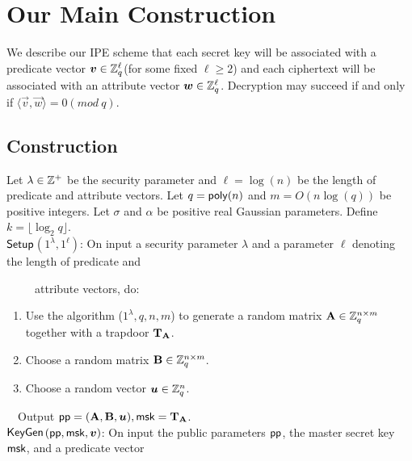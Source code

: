 \section{Our Main Construction}
We describe our IPE scheme that each secret key will be associated with a predicate vector $\boldsymbol{v} \in \mathbb{Z}^{\ell}_{q}$(for some fixed $\ell\geq 2$) and each ciphertext will be associated with an attribute vector $\boldsymbol{w} \in \mathbb{Z}^{\ell}_{q}$. Decryption may succeed if and only if $\langle \vec{v},\vec{w} \rangle=0 (mod\ q)$.
\subsection{Construction}
Let $\lambda \in \mathbb{Z}^{+}$ be the security parameter and $\ell=\log(n)$ be the length of predicate and attribute vectors. Let $q=\mathsf{poly}(n)$ and $m=O(n\log(q))$ be positive integers. Let $\sigma$ and $\alpha$ be positive real Gaussian parameters. Define $k=\lfloor \log_{2}q\rfloor$. \\[0.6cm]
$\mathsf{Setup}$$(1^{\lambda},1^{\ell})$: On input a security parameter $\lambda$ and a parameter $\ell$ denoting the length of predicate and

~~~~~attribute vectors, do:
\begin{enumerate}
\item Use the algorithm \trapgen ($1^{\lambda},q,n,m$) to generate a random matrix $\textbf{A} \in \mathbb{Z}^{n \times m}_{q}$ together with a trapdoor $\mathbf{T}_{\mathbf{A}}$.\\
\item Choose a random matrix $\mathbf{B} \in \mathbb{Z}^{n \times m}_{q}$.\\
\item Choose a random vector $\boldsymbol{u} \in \mathbb{Z}^{n}_{q}$.
\end{enumerate}
~~Output $\mathsf{pp}=(\mathbf{A}, \mathbf{B}, \boldsymbol{u}),\mathsf{msk}=\mathbf{T}_{\mathbf{A}}$.\\[0.4cm]
$\mathsf{KeyGen}$$(\mathsf{pp},\mathsf{msk},\boldsymbol{v})$: On input the public parameters $\mathsf{pp}$, the master secret key $\mathsf{msk}$, and a predicate vector

